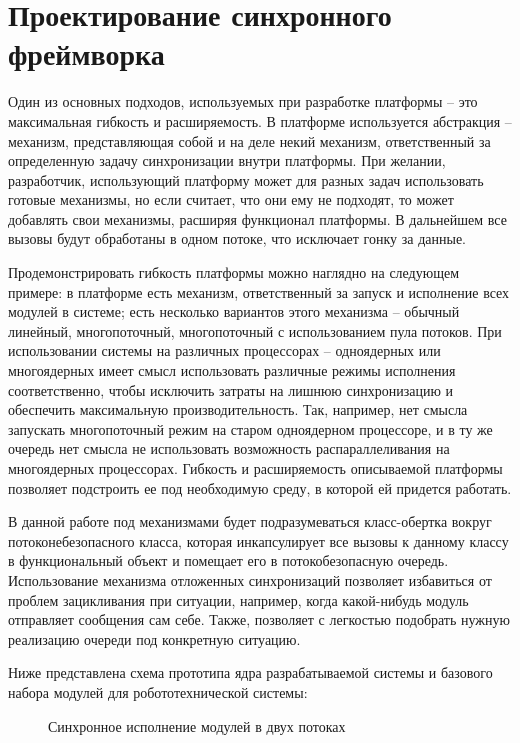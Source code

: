 \section{Проектирование синхронного фреймворка}

Один из основных подходов, используемых при разработке платформы – это максимальная гибкость и расширяемость. В платформе используется абстракция – механизм, представляющая собой и на деле некий механизм, ответственный за определенную задачу синхронизации внутри платформы. При желании, разработчик, использующий платформу может для разных задач использовать готовые механизмы, но если считает, что они ему не подходят, то может добавлять свои механизмы, расширяя функционал платформы. В дальнейшем все вызовы будут обработаны в одном потоке, что исключает гонку за данные.

Продемонстрировать гибкость платформы можно наглядно на следующем примере: в платформе есть механизм, ответственный за запуск и исполнение всех модулей в системе; есть несколько вариантов этого механизма – обычный линейный, многопоточный, многопоточный с использованием пула потоков. При использовании системы на различных процессорах – одноядерных или многоядерных имеет смысл использовать различные режимы исполнения соответственно, чтобы исключить затраты на лишнюю синхронизацию и обеспечить максимальную производительность. Так, например, нет смысла запускать многопоточный режим на старом одноядерном процессоре, и в ту же очередь нет смысла не использовать возможность распараллеливания на многоядерных процессорах. Гибкость и расширяемость описываемой платформы позволяет подстроить ее под необходимую среду, в которой ей придется работать.

В данной работе под механизмами будет подразумеваться класс-обертка вокруг потоконебезопасного класса, которая инкапсулирует все вызовы к данному классу в функциональный объект и помещает его в потокобезопасную очередь. Использование механизма отложенных синхронизаций позволяет избавиться от проблем зацикливания при ситуации, например, когда какой-нибудь модуль отправляет сообщения сам себе. Также, позволяет с легкостью подобрать нужную реализацию очереди под конкретную ситуацию. 

Ниже представлена схема прототипа ядра разрабатываемой системы и базового набора модулей для робототехнической системы:

\begin{figure}[h]
    \caption{Синхронное исполнение модулей в двух потоках}
    \label{im:2_2_1_sync}
\end{figure}

